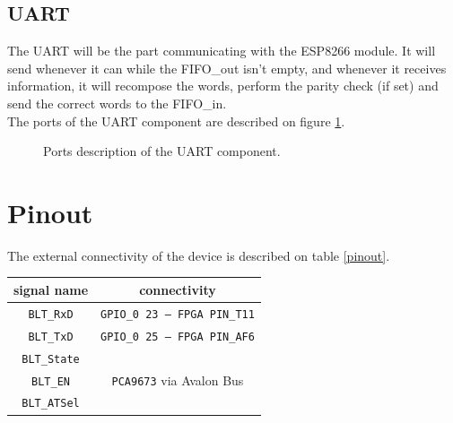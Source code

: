 \documentclass[11pt]{article}
\begin{document}
\subsection{UART}
The UART will be the part communicating with the ESP8266 module. It will send whenever it can while the FIFO\_out isn't empty, and whenever it receives information, it will recompose the words, perform the parity check (if set) and send the correct words to the FIFO\_in.
\\
The ports of the UART component are described on figure \ref{uart_ports}.
\begin{figure}[H]
        \caption{Ports description of the UART component.}
        \label{uart_ports}
\end{figure}

\section{Pinout}
The external connectivity of the device is described on table \ref{pinout}.
\begin{center}
\label{pinout}
\begin{tabular}{|c|c|}
\hline
signal name & connectivity\\
\hline
\texttt{BLT\_RxD} & \texttt{GPIO\_0 23 -- FPGA PIN\_T11}\\
\hline
\texttt{BLT\_TxD} & \texttt{GPIO\_0 25 -- FPGA PIN\_AF6}\\
\hline
\texttt{BLT\_State} & \multirow{3}{*}{\texttt{PCA9673} via Avalon Bus}\\
\cline{1-1}
\texttt{BLT\_EN} &\\
\cline{1-1}
\texttt{BLT\_ATSel} &\\
\hline
\end{tabular}
\end{center}
\end{document}
